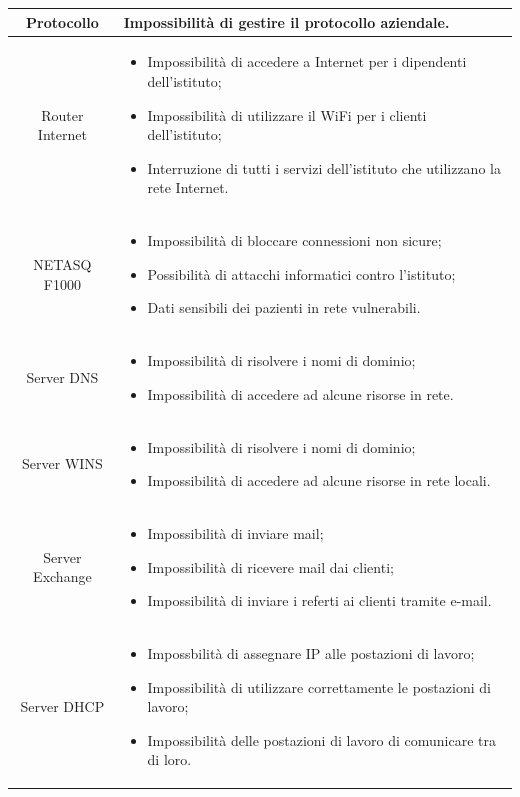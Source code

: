 \documentclass[12pt, a4paper, titlepage]{report}
\begin{document}
\begin{longtable}{| c | p{10cm} |}
				Protocollo & Impossibilità di gestire il protocollo aziendale.\\ \hline
				Router Internet & \begin{itemize}\item Impossibilità di accedere a Internet per i dipendenti dell'istituto; \item Impossibilità di utilizzare il WiFi per i clienti dell'istituto; \item Interruzione di tutti i servizi dell'istituto che utilizzano la rete Internet.\end{itemize}				 \\ \hline
				NETASQ F1000 & \begin{itemize}\item Impossibilità di bloccare connessioni non sicure; \item Possibilità di attacchi informatici contro l'istituto; \item Dati sensibili dei pazienti in rete vulnerabili.	\end{itemize}\\ \hline
				Server DNS & \begin{itemize}\item Impossibilità di risolvere i nomi di dominio; \item Impossibilità di accedere ad alcune risorse in rete.	\end{itemize}\\ \hline
				Server WINS & \begin{itemize}\item Impossibilità di risolvere i nomi di dominio; \item Impossibilità di accedere ad alcune risorse in rete locali.	\end{itemize}\\ \hline
				Server Exchange & \begin{itemize}\item Impossibilità di inviare mail; \item Impossibilità di ricevere mail dai clienti; \item Impossibilità di inviare i referti ai clienti tramite e-mail.	\end{itemize}\\ \hline
				Server DHCP & \begin{itemize}\item Impossbilità di assegnare IP alle postazioni di lavoro; \item Impossibilità di utilizzare correttamente le postazioni di lavoro; \item Impossibilità delle postazioni di lavoro di comunicare tra di loro.	\end{itemize}\\ \hline

\end{longtable}
\end{document}
